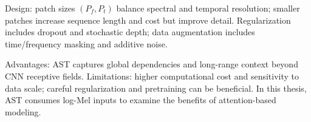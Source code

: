 Design: patch sizes \((P_f,P_t)\) balance spectral and temporal resolution; smaller patches increase sequence length and cost but improve detail. Regularization includes dropout and stochastic depth; data augmentation includes time/frequency masking and additive noise.

Advantages: AST captures global dependencies and long-range context beyond CNN receptive fields. Limitations: higher computational cost and sensitivity to data scale; careful regularization and pretraining can be beneficial. In this thesis, AST consumes log-Mel inputs to examine the benefits of attention-based modeling.




